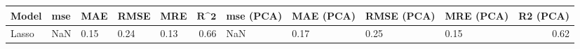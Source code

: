 \begin{table}
\centering
\label{table:iri_reg_pred}
\begin{tabular}{lllllrllllr}
\toprule
\textbf{Model} & \textbf{mse} & \textbf{MAE} & \textbf{RMSE} & \textbf{MRE} & $\textbf{R^2}$ & \textbf{mse (PCA)} & \textbf{MAE (PCA)} & \textbf{RMSE (PCA)} & \textbf{MRE (PCA)} & \textbf{R2 (PCA)} \\
\midrule
         Lasso &          NaN &         0.15 &          0.24 &         0.13 &           0.66 &                NaN &               0.17 &                0.25 &               0.15 &              0.62 \\
\bottomrule
\end{tabular}
\end{table}

